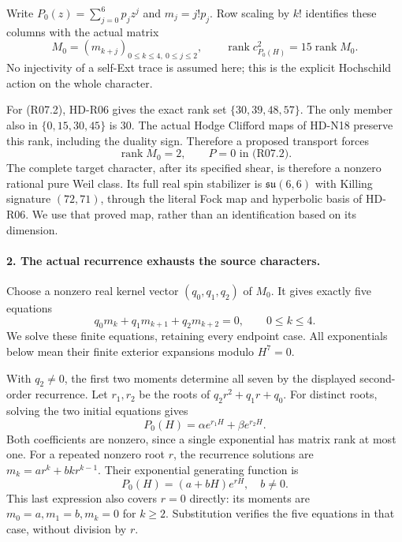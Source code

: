 Write $P_0(z)=\sum_{j=0}^6p_jz^j$ and $m_j=j!p_j$. Row
scaling by $k!$ identifies these columns with the actual matrix
\[
 M_0=(m_{k+j})_{0\le k\le4,\ 0\le j\le2},\qquad
           \operatorname{rank}c_{P_0(H)}^2
                       =15\operatorname{rank}M_0.            \tag{R07.4}
\]
No injectivity of a self-Ext trace is assumed here; this is the
explicit Hochschild action on the whole character.

For (R07.2), HD-R06 gives the exact rank set
$\{30,39,48,57\}$. The only member also in
$\{0,15,30,45\}$ is $30$. The actual Hodge Clifford maps of
HD-N18 preserve this rank, including the duality sign. Therefore
a proposed transport forces
\[
             \operatorname{rank}M_0=2,
             \qquad P=0\text{ in (R07.2)}.                 \tag{R07.5}
\]
The complete target character, after its specified shear, is
therefore a nonzero rational pure Weil class. Its full real spin
stabilizer is $\mathfrak{su}(6,6)$ with Killing signature
$(72,71)$, through the literal Fock map and hyperbolic basis of
HD-R06. We use that proved map, rather than an identification
based on its dimension.

\paragraph{2. The actual recurrence exhausts the source characters.}
Choose a nonzero real kernel vector $(q_0,q_1,q_2)$ of $M_0$.
It gives exactly five equations
\[
             q_0m_k+q_1m_{k+1}+q_2m_{k+2}=0,
                                  \qquad0\le k\le4.         \tag{R07.6}
\]
We solve these finite equations, retaining every endpoint case.
All exponentials below mean their finite exterior expansions
modulo $H^7=0$.

With $q_2\ne0$, the first two moments determine all seven by
the displayed second-order recurrence. Let $r_1,r_2$ be the
roots of $q_2r^2+q_1r+q_0$. For distinct roots, solving the
two initial equations gives
\[
 P_0(H)=\alpha e^{r_1H}+\beta e^{r_2H}.                       \tag{R07.7}
\]
Both coefficients are nonzero, since a single exponential has
matrix rank at most one. For a repeated nonzero root $r$, the
recurrence solutions are $m_k=ar^k+bk r^{k-1}$. Their exponential
generating function is
\[
                         P_0(H)=(a+bH)e^{rH},\quad b\ne0.    \tag{R07.8}
\]
This last expression also covers $r=0$ directly: its moments are
$m_0=a,m_1=b,m_k=0$ for $k\ge2$. Substitution verifies the
five equations in that case, without division by $r$.

